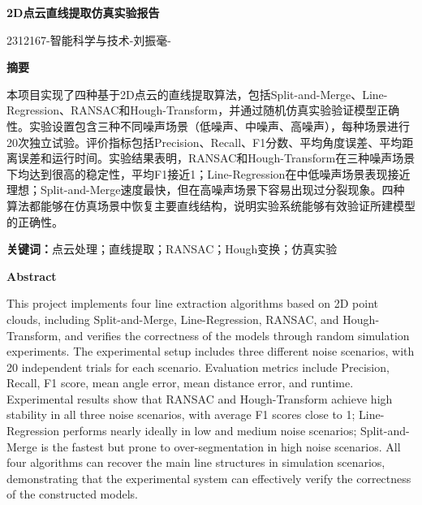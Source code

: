 \documentclass[12pt,a4paper]{article}
\begin{document}
\newpage

\begin{center}
        \centering
    \vspace*{2cm}
    {\heiti\fontsize{22pt}{\baselineskip}\bfseries 2D点云直线提取仿真实验报告\par}
    \vspace{1cm}
    {\fontsize{14pt}{\baselineskip} 2312167-智能科学与技术-刘振毫-\par}
    \vspace{3cm}

    \vfill
{\heiti\fontsize{18pt}{\baselineskip}\bfseries 摘\quad 要}
\end{center}
\vspace{-12pt}
\setlength{\parskip}{0pt}

\begin{singlespace}
{\songti\fontsize{12pt}{20pt}\selectfont
本项目实现了四种基于2D点云的直线提取算法，包括Split-and-Merge、Line-Regression、RANSAC和Hough-Transform，并通过随机仿真实验验证模型正确性。实验设置包含三种不同噪声场景（低噪声、中噪声、高噪声），每种场景进行20次独立试验。评价指标包括Precision、Recall、F1分数、平均角度误差、平均距离误差和运行时间。实验结果表明，RANSAC和Hough-Transform在三种噪声场景下均达到很高的稳定性，平均F1接近1；Line-Regression在中低噪声场景表现接近理想；Split-and-Merge速度最快，但在高噪声场景下容易出现过分裂现象。四种算法都能够在仿真场景中恢复主要直线结构，说明实验系统能够有效验证所建模型的正确性。
}
\end{singlespace}

\vspace{12pt}
{\songti\fontsize{12pt}{20pt}\selectfont \textbf{关键词：}点云处理；直线提取；RANSAC；Hough变换；仿真实验}

\vspace{36pt}

\begin{center}
{\fontsize{18pt}{\baselineskip}\bfseries\selectfont Abstract}
\end{center}
\vspace{-12pt}

\begin{singlespace}
{\fontsize{12pt}{20pt}\selectfont
This project implements four line extraction algorithms based on 2D point clouds, including Split-and-Merge, Line-Regression, RANSAC, and Hough-Transform, and verifies the correctness of the models through random simulation experiments. The experimental setup includes three different noise scenarios, with 20 independent trials for each scenario. Evaluation metrics include Precision, Recall, F1 score, mean angle error, mean distance error, and runtime. Experimental results show that RANSAC and Hough-Transform achieve high stability in all three noise scenarios, with average F1 scores close to 1; Line-Regression performs nearly ideally in low and medium noise scenarios; Split-and-Merge is the fastest but prone to over-segmentation in high noise scenarios. All four algorithms can recover the main line structures in simulation scenarios, demonstrating that the experimental system can effectively verify the correctness of the constructed models.
}
\end{singlespace}
\end{document}
